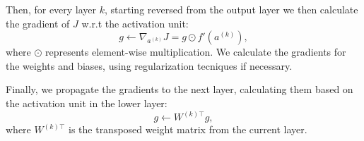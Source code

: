 \documentclass{article}
\begin{document}
Then, for every layer $k$, starting reversed from the output layer we then calculate the gradient of $J$ w.r.t the activation unit: \begin{equation*}
    g \gets \nabla_{a^{(k)}} J = g \odot f'(a^{(k)}),
\end{equation*} where $\odot$ represents element-wise multiplication. We calculate the gradients for the weights and biases, using regularization tecniques if necessary.

Finally, we propagate the gradients to the next layer, calculating them based on the activation unit in the lower layer: \begin{equation*}
    g \gets W^{(k) \top} g,
\end{equation*} where $W^{(k) \top}$ is the transposed weight matrix from the current layer. \cite{goodfellow_deep_2016}
\end{document}
